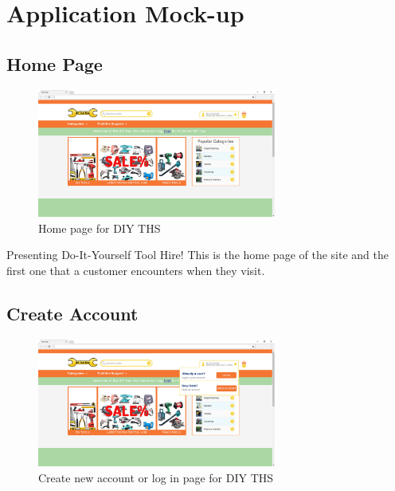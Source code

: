 \hypertarget{application-mock-up}{%
\section{Application Mock-up}\label{application-mock-up}}

\hypertarget{home-page}{%
\subsection{Home Page}\label{home-page}}

\begin{figure}[H]
      \centering
      \includegraphics[trim = 0 0 0 0, clip, width=0.7\textwidth]{TempImg/home_screen.jpg}
      \caption{Home page for DIY THS}
 \end{figure}

Presenting Do-It-Yourself Tool Hire! This is the home page of the site
and the first one that a customer encounters when they visit.

\hypertarget{create-account}{%
\subsection{Create Account}\label{create-account}}

\begin{figure}[H]
      \centering
      \includegraphics[trim = 0 0 0 0, clip, width=0.7\textwidth]{TempImg/login_create_account.jpg}
      \caption{Create new account or log in page for DIY THS}
 \end{figure}

